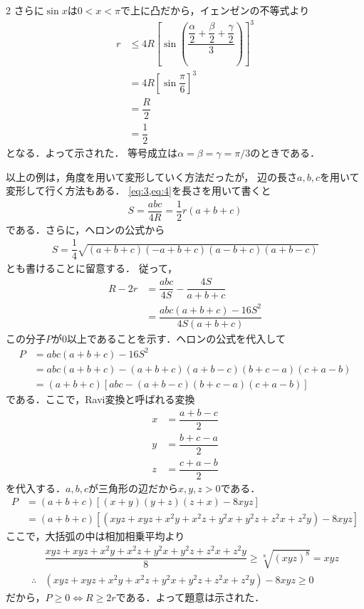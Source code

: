 \documentclass[../../main.tex]{subfiles}
\begin{document}
\begin{multicols}{2}
  さらに$\sin x$は$0<x<\pi$で上に凸だから，イェンゼンの不等式より
  \begin{align}
    r
    & \le 4R \left[\sin\left(\dfrac{\dfrac{\alpha}{2}+\dfrac{\beta}{2}+\dfrac{\gamma}{2}}{3}\right)\right]^3 \\
    & = 4R\left[\sin\dfrac{\pi}{6} \right]^3                                                              \\
    & = \dfrac{R}{2}                                                                                      \\
    & = \dfrac{1}{2}
  \end{align}
  となる．よって示された．
  等号成立は$\alpha=\beta=\gamma=\pi/3$のときである．

  以上の例は，角度を用いて変形していく方法だったが，
  辺の長さ$a,b,c$を用いて変形して行く方法もある．
  \cref{eq:3,eq:4}を長さを用いて書くと
  \begin{align}
    S = \dfrac{abc}{4R} = \dfrac{1}{2}r(a+b+c)
  \end{align}
  である．さらに，ヘロンの公式から
  \begin{align}
    S = \dfrac{1}{4}\sqrt{(a+b+c)(-a+b+c)(a-b+c)(a+b-c)}
  \end{align}
  とも書けることに留意する．
  従って，
  \begin{align}
    R-2r
    & = \dfrac{abc}{4S} - \dfrac{4S}{a+b+c}    \\
    & = \dfrac{abc(a+b+c) - 16S^2}{4S(a+b+c)}
  \end{align}
  この分子$P$が0以上であることを示す．ヘロンの公式を代入して
  \begin{align}
    P
    & = abc(a+b+c) - 16S^2                             \\
    & = abc(a+b+c) - (a+b+c)(a+b-c)(b+c-a)(c+a-b)      \\
    & = (a+b+c)\left[abc-(a+b-c)(b+c-a)(c+a-b) \right]
  \end{align}
  である．ここで，Ravi変換と呼ばれる変換
  \begin{align}
    x & = \dfrac{a+b-c}{2} \\
    y & = \dfrac{b+c-a}{2} \\
    z & = \dfrac{c+a-b}{2}
  \end{align}
  を代入する．$a,b,c$が三角形の辺だから$x,y,z>0$である．
  \begin{align}
    P
    & = (a+b+c)\left[(x+y)(y+z)(z+x) - 8xyz\right]                         \\
    & = (a+b+c)\left[(xyz+xyz+x^2y+x^2z+y^2x+y^2z+z^2x+z^2y) - 8xyz\right]
  \end{align}
  ここで，大括弧の中は相加相乗平均より
  \begin{align}
    & \dfrac{xyz+xyz+x^2y+x^2z+y^2x+y^2z+z^2x+z^2y}{8} \ge \sqrt[8]{(xyz)^8} = xyz \\
    \therefore
    & (xyz+xyz+x^2y+x^2z+y^2x+y^2z+z^2x+z^2y) - 8xyz \ge 0
  \end{align}
  だから，$P\ge 0 \iff R \ge 2r$である．よって題意は示された．

  \newpage
\end{multicols}
\end{document}
